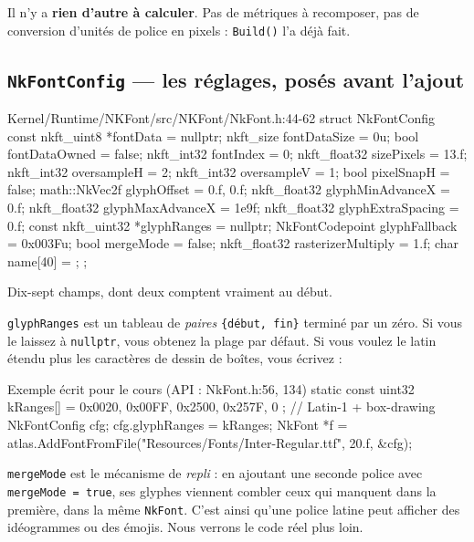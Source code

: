 Il n'y a \textbf{rien d'autre à calculer}. Pas de métriques à recomposer, pas de
conversion d'unités de police en pixels : \texttt{Build()} l'a déjà fait.

\subsection{\texttt{NkFontConfig} — les réglages, posés avant l'ajout}

\begin{nkcode}{Kernel/Runtime/NKFont/src/NKFont/NkFont.h:44-62}
    struct NkFontConfig {
            const nkft_uint8 *fontData = nullptr;
            nkft_size fontDataSize = 0u;
            bool fontDataOwned = false;
            nkft_int32 fontIndex = 0;
            nkft_float32 sizePixels = 13.f;
            nkft_int32 oversampleH = 2;
            nkft_int32 oversampleV = 1;
            bool pixelSnapH = false;
            math::NkVec2f glyphOffset = {0.f, 0.f};
            nkft_float32 glyphMinAdvanceX = 0.f;
            nkft_float32 glyphMaxAdvanceX = 1e9f;
            nkft_float32 glyphExtraSpacing = 0.f;
            const nkft_uint32 *glyphRanges = nullptr;
            NkFontCodepoint glyphFallback = 0x003Fu;
            bool mergeMode = false;
            nkft_float32 rasterizerMultiply = 1.f;
            char name[40] = {};
    };
\end{nkcode}

Dix-sept champs, dont deux comptent vraiment au début.

\texttt{glyphRanges} est un tableau de \emph{paires} \texttt{\{début, fin\}}
terminé par un zéro. Si vous le laissez à \texttt{nullptr}, vous obtenez la
plage par défaut. Si vous voulez le latin étendu plus les caractères de
dessin de boîtes, vous écrivez :

\begin{nkcode}{Exemple écrit pour le cours (API : NkFont.h:56, 134)}
static const uint32 kRanges[] = { 0x0020, 0x00FF, 0x2500, 0x257F, 0 };  // Latin-1 + box-drawing
NkFontConfig cfg;
cfg.glyphRanges = kRanges;
NkFont *f = atlas.AddFontFromFile("Resources/Fonts/Inter-Regular.ttf", 20.f, &cfg);
\end{nkcode}

\texttt{mergeMode} est le mécanisme de \emph{repli} : en ajoutant une seconde
police avec \texttt{mergeMode = true}, ses glyphes viennent combler ceux qui
manquent dans la première, dans la même \texttt{NkFont}. C'est ainsi qu'une
police latine peut afficher des idéogrammes ou des émojis. Nous verrons le code
réel plus loin.

